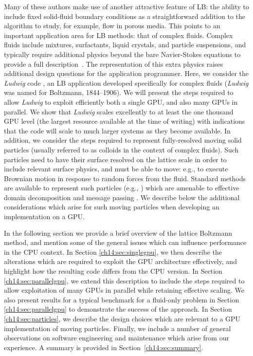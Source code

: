 Many of these authors make use of
another attractive feature of LB: the ability to include fixed
solid-fluid boundary conditions as a straightforward addition to
the algorithm to study, for example, flow in
porous media. This points to an important
application area for LB methods: that of complex fluids.
Complex fluids include mixtures, surfactants, liquid crystals,
and particle suspensions, and typically require additional physics
beyond the bare Navier-Stokes equations to provide a full
description~\cite{aidun2010}. The representation of this extra
physics raises additional design questions for the application
programmer. Here, we consider the \textit{Ludwig} code \cite{desplat},
an LB application developed specifically for complex fluids
(\textit{Ludwig} was named for Boltzmann, 1844--1906).
We will present the steps
required to allow \textit{Ludwig} to exploit efficiently both a single
GPU, and also many GPUs in parallel.  We show that
\textit{Ludwig} scales excellently to at least the one thousand GPU level
(the largest resource available at the time of writing) with
indications that the code will scale to much larger systems as
they become available. In addition, we consider the steps required
to represent fully-resolved moving solid particles (usually referred
to as colloids in the context of complex fluids). Such particles
need to have their surface resolved on the lattice scale in order
to include relevant surface physics, and must be able to move: e.g.,
to execute Brownian motion in response to random forces from the
fluid. Standard methods are available to represent such particles
(e.g., \cite{ladd1994,nguyen2002}) which are amenable to effective
domain decomposition and message passing \cite{stratford2008}.
We describe below the additional considerations which arise
for such moving particles when developing an
implementation on a GPU.

In the following section we provide a brief overview of the lattice
Boltzmann method, and mention some of the general issues which can
influence performance in the CPU context.
In Section \ref{ch14:sec:singlegpu}, we then describe the alterations
which are required to exploit the GPU architecture effectively, and
highlight how the resulting code differs from the CPU version. In
Section \ref{ch14:sec:parallelgpu}, we extend this description to
include the steps required to allow exploitation of many GPUs in
parallel while retaining effective scaling. We also present results for
a typical benchmark for a fluid-only problem in Section
\ref{ch14:sec:parallelgpu} to demonstrate the success of the approach.
In Section \ref{ch14:sec:particles}, we describe the design choices
which are relevant to a GPU implementation of moving particles. Finally,
we include a number of general observations on software
engineering and maintenance which arise from our experience.
A summary is provided in Section~\ref{ch14:sec:summary}.


